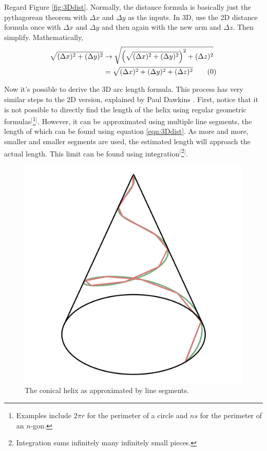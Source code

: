 \documentclass{article}
\begin{document}
Regard Figure \ref{fig:3Ddist}. Normally, the distance formula is basically just the pythagorean theorem with $\Delta x$ and $\Delta y$ as the inputs. In 3D, use the 2D distance formula once with $\Delta x$ and $\Delta y$ and then again with the new arm and $\Delta z$. Then simplify. Mathematically,
\begin{align*}
    \sqrt{(\Delta x)^2+(\Delta y)^2} &\rightarrow \sqrt{\left(\sqrt{(\Delta x)^2+(\Delta y)^2}\right)^2+(\Delta z)^2}\\
    &= \sqrt{(\Delta x)^2+(\Delta y)^2+(\Delta z)^2}\tag{\theequation}\label{eqn:3Ddist}
    \stepcounter{equation}
\end{align*}\par
Now it's possible to derive the 3D arc length formula. This process has very similar steps to the 2D version, explained by Paul Dawkins \cite{Bib:2Darc}. First, notice that it is not possible to directly find the length of the helix using regular geometric formulas$^[$\footnote{Examples include $2\pi r$ for the perimeter of a circle and $ns$ for the perimeter of an $n$-gon.}$^]$. However, it can be approximated using multiple line segments, the length of which can be found using equation \ref{eqn:3Ddist}. As more and more, smaller and smaller segments are used, the estimated length will approach the actual length. This limit can be found using integration$^[$\footnote{Integration sums infinitely many infinitely small pieces.}$^]$.\par

\begin{figure}[h!]
    \centering
    \includegraphics[width=0.4\linewidth]{Blender/helixsegs.png}
    \caption{The conical helix as approximated by line segments.}
    \label{fig:helixsegs}
\end{figure}
\end{document}
